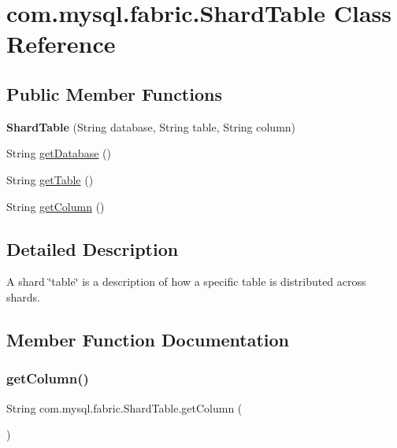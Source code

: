 \hypertarget{classcom_1_1mysql_1_1fabric_1_1_shard_table}{}\section{com.\+mysql.\+fabric.\+Shard\+Table Class Reference}
\label{classcom_1_1mysql_1_1fabric_1_1_shard_table}
\subsection*{Public Member Functions}
\begin{DoxyCompactItemize}
\item 
\mbox{\label{classcom_1_1mysql_1_1fabric_1_1_shard_table_acc091617ef2dce29d894f14939d5e38f}} 
{\bfseries Shard\+Table} (String database, String table, String column)
\item 
String \mbox{\hyperlink{classcom_1_1mysql_1_1fabric_1_1_shard_table_ae105c3d6f617c81a53da057f013088ad}{get\+Database}} ()
\item 
String \mbox{\hyperlink{classcom_1_1mysql_1_1fabric_1_1_shard_table_aff4dc70c77c2d461ebd7609937423402}{get\+Table}} ()
\item 
String \mbox{\hyperlink{classcom_1_1mysql_1_1fabric_1_1_shard_table_a4c057febf00f07a391e50f6fcdb32539}{get\+Column}} ()
\end{DoxyCompactItemize}


\subsection{Detailed Description}
A shard \char`\"{}table\char`\"{} is a description of how a specific table is distributed across shards. 

\subsection{Member Function Documentation}
\mbox{\label{classcom_1_1mysql_1_1fabric_1_1_shard_table_a4c057febf00f07a391e50f6fcdb32539}} 
\subsubsection{\texorpdfstring{get\+Column()}{getColumn()}}
{\footnotesize\ttfamily String com.\+mysql.\+fabric.\+Shard\+Table.\+get\+Column (\begin{DoxyParamCaption}{ }\end{DoxyParamCaption})}

